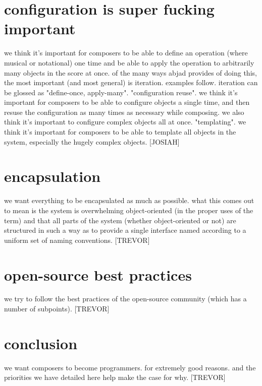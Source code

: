 \documentclass{article}
\begin{document}
\section{configuration is super fucking important}
we think it's important for
composers to be able to define an operation (where musical or notational) one
time and be able to apply the operation to arbitrarily many objects in the
score at once. of the many ways abjad provides of doing this, the most
important (and most general) is iteration. examples follow. iteration can be
glossed as "define-once, apply-many". "configuration reuse". we think it's
important for composers to be able to configure objects a single time, and then
resuse the configuration as many times as necessary while composing. we also
think it's important to configure complex objects all at once. "templating". we
think it's important for composers to be able to template all objects in the
system, especially the hugely complex objects. [JOSIAH]

\section{encapsulation}
we want everything to be encapsulated as much as
possible. what this comes out to mean is the system is overwhelming
object-oriented (in the proper uses of the term) and that all parts of the
system (whether object-oriented or not) are structured in such a way as to
provide a single interface named according to a uniform set of naming
conventions. [TREVOR]

\section{open-source best practices}
we try to follow the best practices of the open-source community (which has
a number of subpoints). [TREVOR]

\section{conclusion}
we want composers to become programmers. for extremely good
reasons. and the priorities we have detailed here help make the case for why.
[TREVOR]


\end{document}

